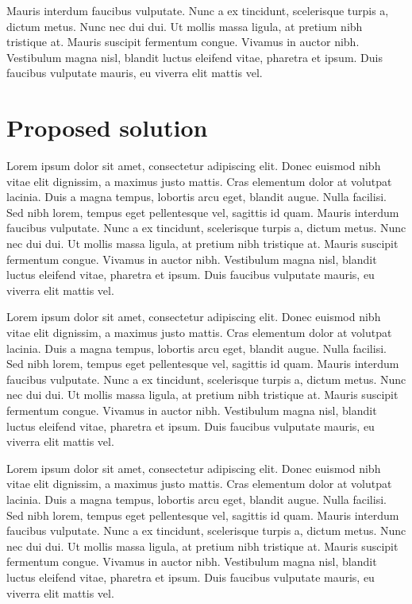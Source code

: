 \documentclass{article}
\begin{document}
Mauris interdum faucibus vulputate.
Nunc a ex tincidunt, scelerisque turpis a, dictum metus.
Nunc nec dui dui.
Ut mollis massa ligula, at pretium nibh tristique at.
Mauris suscipit fermentum congue.
Vivamus in auctor nibh.
Vestibulum magna nisl, blandit luctus eleifend vitae, pharetra et ipsum.
Duis faucibus vulputate mauris, eu viverra elit mattis vel.



\section{Proposed solution}
Lorem ipsum dolor sit amet, consectetur adipiscing elit.
Donec euismod nibh vitae elit dignissim, a maximus justo mattis.
Cras elementum dolor at volutpat lacinia.
Duis a magna tempus, lobortis arcu eget, blandit augue.
Nulla facilisi.
Sed nibh lorem, tempus eget pellentesque vel, sagittis id quam.
Mauris interdum faucibus vulputate.
Nunc a ex tincidunt, scelerisque turpis a, dictum metus.
Nunc nec dui dui.
Ut mollis massa ligula, at pretium nibh tristique at.
Mauris suscipit fermentum congue.
Vivamus in auctor nibh.
Vestibulum magna nisl, blandit luctus eleifend vitae, pharetra et ipsum.
Duis faucibus vulputate mauris, eu viverra elit mattis vel.

Lorem ipsum dolor sit amet, consectetur adipiscing elit.
Donec euismod nibh vitae elit dignissim, a maximus justo mattis.
Cras elementum dolor at volutpat lacinia.
Duis a magna tempus, lobortis arcu eget, blandit augue.
Nulla facilisi.
Sed nibh lorem, tempus eget pellentesque vel, sagittis id quam.
Mauris interdum faucibus vulputate.
Nunc a ex tincidunt, scelerisque turpis a, dictum metus.
Nunc nec dui dui.
Ut mollis massa ligula, at pretium nibh tristique at.
Mauris suscipit fermentum congue.
Vivamus in auctor nibh.
Vestibulum magna nisl, blandit luctus eleifend vitae, pharetra et ipsum.
Duis faucibus vulputate mauris, eu viverra elit mattis vel.

Lorem ipsum dolor sit amet, consectetur adipiscing elit.
Donec euismod nibh vitae elit dignissim, a maximus justo mattis.
Cras elementum dolor at volutpat lacinia.
Duis a magna tempus, lobortis arcu eget, blandit augue.
Nulla facilisi.
Sed nibh lorem, tempus eget pellentesque vel, sagittis id quam.
Mauris interdum faucibus vulputate.
Nunc a ex tincidunt, scelerisque turpis a, dictum metus.
Nunc nec dui dui.
Ut mollis massa ligula, at pretium nibh tristique at.
Mauris suscipit fermentum congue.
Vivamus in auctor nibh.
Vestibulum magna nisl, blandit luctus eleifend vitae, pharetra et ipsum.
Duis faucibus vulputate mauris, eu viverra elit mattis vel.
\end{document}
